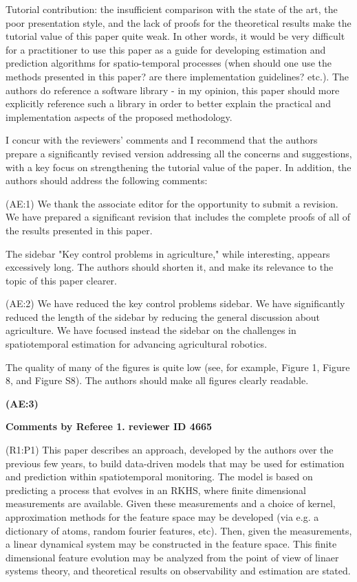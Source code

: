 \documentclass{letter}
\begin{document}
Tutorial contribution: the insufficient comparison with the state of
the art, the poor presentation style, and the lack of proofs for the
theoretical results make the tutorial value of this paper quite weak.
In other words, it would be very difficult for a practitioner to use
this paper as a guide for developing estimation and prediction
algorithms for spatio-temporal processes (when should one use the
methods presented in this paper? are there implementation guidelines?
etc.). The authors do reference a software library - in my opinion,
this paper should more explicitly reference such a library in order to
better explain the practical and implementation aspects of the proposed
methodology.

 I concur with the reviewers’ comments and I recommend that the authors
prepare a significantly revised version addressing all the
concerns and suggestions, with a key focus on strengthening the
tutorial value of the paper. In addition, the authors should address
the following comments:

{\color{red}(AE:1)} We thank the associate editor for the opportunity to submit a revision.  We have prepared a significant revision that includes the complete proofs of all of the results presented in this paper. 


The sidebar "Key control problems in agriculture," while
interesting, appears excessively long. The authors should shorten it,
and make its relevance to the topic of this paper clearer.

{\color{red}(AE:2)} We have reduced the key control problems sidebar. We have significantly reduced the length of the sidebar by reducing the general discussion about agriculture. We have focused instead the sidebar on the challenges in spatiotemporal estimation for advancing agricultural robotics.


The quality of many of the figures is quite low (see, for example,
Figure 1, Figure 8, and Figure S8). The authors should make all figures
clearly readable.

\textbf{(AE:3)} 


{\bf Comments by Referee 1. reviewer ID 4665}

{\color{red}(R1:P1)} This paper describes an approach, developed by the authors over the
previous few years, to build data-driven models that may be used for
estimation and prediction within spatiotemporal monitoring. The model
is based on predicting a process that evolves in an RKHS, where finite
dimensional measurements are available. Given these measurements and a
choice of kernel, approximation methods for the feature space may be
developed (via e.g. a dictionary of atoms, random fourier features,
etc). Then, given the measurements, a linear dynamical system may be
constructed in the feature space. This finite dimensional feature
evolution may be analyzed from the point of view of linaer systems
theory, and theoretical results on observability and estimation are
stated. 
\end{document}
